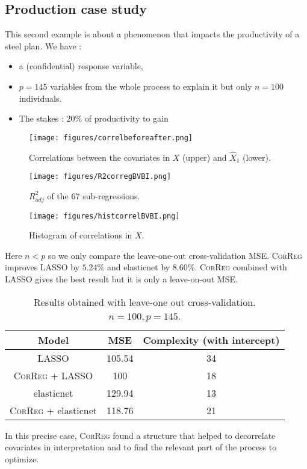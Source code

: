 \documentclass[11pt,a4paper]{article}
\begin{document}
		\subsection{Production case study}
This second example is about a phenomenon that impacts the productivity of a steel plan.
We have :
		\begin{itemize}
			\item a (confidential)  response variable,
			\item $p=145$ variables from the whole process to explain it but only $n=100$ individuals.
			\item The stakes : $20\%$ of productivity to gain
		\end{itemize}
		
\begin{figure}[h!]
	\begin{minipage}[l]{.30\linewidth}
			\texttt{[image: figures/correlbeforeafter.png]} 
			\caption{Correlations between the covariates in $X$ (upper) and $\hat{X}_1$ (lower).}
	\end{minipage} \hfill
	\begin{minipage}[c]{.30\linewidth}
			\texttt{[image: figures/R2corregBVBI.png]} 
			\caption{$R^2_{adj}$ of the 67 sub-regressions.}
	\end{minipage} \hfill
   \begin{minipage}[r]{.30\linewidth}
			\texttt{[image: figures/histcorrelBVBI.png]} 
			\caption{Histogram of correlations in $X$.} 
   \end{minipage}
\end{figure}   			
	Here $n<p$ so we only compare the leave-one-out cross-validation MSE.
	\textsc{CorReg} improves LASSO by $5.24\%$ and elasticnet by $8.60\%$. \textsc{CorReg} combined with LASSO gives the best result but it is only a leave-on-out MSE.
\begin{table}[h!]
\centering
\begin{tabular}{|c|c|c|}
	\hline 
	Model & MSE & Complexity (with intercept) \\ 
	\hline 
	LASSO & 105.54 & 34 \\ 
	\hline 
	\textsc{CorReg} + LASSO & 100 & 18 \\ 
	\hline 
	elasticnet & 129.94 & 13 \\ 
	\hline 
	\textsc{CorReg} + elasticnet & 118.76 & 21 \\ 
	\hline 
\end{tabular} 
\caption{Results obtained with leave-one out cross-validation. $n=100, p=145$.}	
\end{table}
In this precise case, \textsc{CorReg} found a structure that helped to decorrelate covariates in interpretation and to find the relevant part of the process to optimize.
\end{document}
